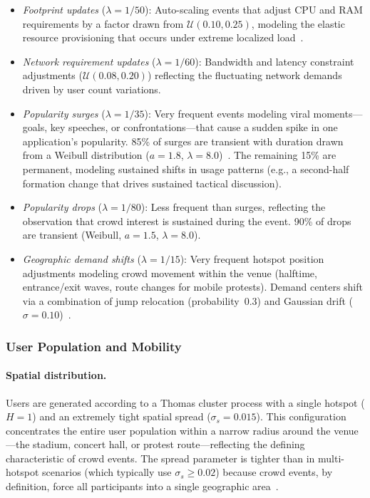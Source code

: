 \begin{itemize}
    \item \emph{Footprint updates} ($\lambda = 1/50$): Auto-scaling events that adjust CPU and RAM requirements by a factor drawn from $\mathcal{U}(0.10, 0.25)$, modeling the elastic resource provisioning that occurs under extreme localized load~\cite{Cortez2017Resource}.
    
    \item \emph{Network requirement updates} ($\lambda = 1/60$): Bandwidth and latency constraint adjustments ($\mathcal{U}(0.08, 0.20)$) reflecting the fluctuating network demands driven by user count variations.
    
    \item \emph{Popularity surges} ($\lambda = 1/35$): Very frequent events modeling viral moments---goals, key speeches, or confrontations---that cause a sudden spike in one application's popularity. 85\% of surges are transient with duration drawn from a Weibull distribution ($a = 1.8$, $\lambda = 8.0$)~\cite{Crane2008Robust}. The remaining 15\% are permanent, modeling sustained shifts in usage patterns (e.g., a second-half formation change that drives sustained tactical discussion).
    
    \item \emph{Popularity drops} ($\lambda = 1/80$): Less frequent than surges, reflecting the observation that crowd interest is sustained during the event. 90\% of drops are transient (Weibull, $a = 1.5$, $\lambda = 8.0$).
    
    \item \emph{Geographic demand shifts} ($\lambda = 1/15$): Very frequent hotspot position adjustments modeling crowd movement within the venue (halftime, entrance/exit waves, route changes for mobile protests). Demand centers shift via a combination of jump relocation (probability~0.3) and Gaussian drift ($\sigma = 0.10$)~\cite{Camp2002Survey, Wang2019Delay}.
\end{itemize}

\subsubsection{User Population and Mobility}

\paragraph{Spatial distribution.} Users are generated according to a Thomas cluster process with a single hotspot ($H = 1$) and an extremely tight spatial spread ($\sigma_s = 0.015$). This configuration concentrates the entire user population within a narrow radius around the venue---the stadium, concert hall, or protest route---reflecting the defining characteristic of crowd events. The spread parameter is tighter than in multi-hotspot scenarios (which typically use $\sigma_s \geq 0.02$) because crowd events, by definition, force all participants into a single geographic area~\cite{Saha2016Enriched}.

